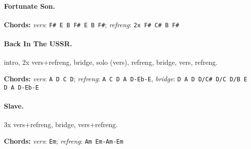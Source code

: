 \documentclass[%
twoside,                 %
final,                   %
10pt]{article}
\begin{document}
\paragraph{Fortunate Son.}


\textbf{Chords:} \emph{vers}: \Verb!F# E B F# E B F#!; \emph{refreng}: \Verb!2x F# C# B F#!





\paragraph{Back In The USSR.}
intro, 2x vers+refreng, bridge, solo (vers), refreng, bridge, vers, refreng.

\textbf{Chords:} \emph{vers}: \Verb!A D C D!; \emph{refreng}: \Verb!A C D A D-Eb-E!,
\emph{bridge}: \Verb!D A D D/C# D/C D/B E D A D-Eb-E!





\paragraph{Slave.}
3x vers+refreng, bridge, vers+refreng.

\textbf{Chords:} \emph{vers}: \Verb!Em!; \emph{refreng}: \Verb!Am Em-Am-Em!








\printindex
\end{document}
